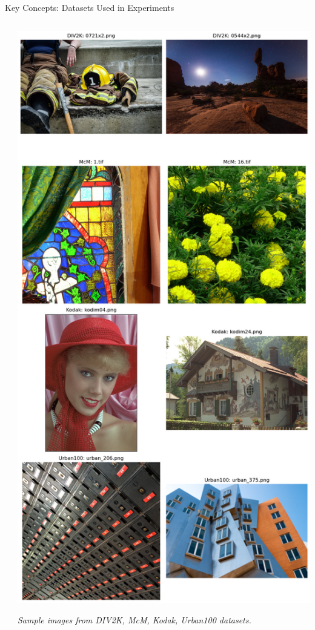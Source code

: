 \documentclass[aspectratio=169,xcolor=dvipsnames]{beamer}
\begin{document}
\begin{frame}{Key Concepts: Datasets Used in Experiments}
\begin{columns}[c]
\begin{column}{0.7\textwidth}
\begin{itemize}
\end{itemize}

\end{column}

\begin{column}{0.3\textwidth}

\begin{center}
    \includegraphics[width=0.7\linewidth]{dataset.png}
    
    \vspace{0.2cm}
    \tiny \textit{Sample images from DIV2K, McM, Kodak, Urban100 datasets.}
\end{center}

\end{column}

\end{columns}

\end{frame}
\end{document}
